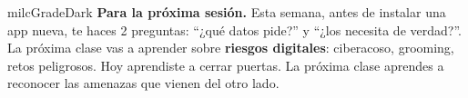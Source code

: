 \documentclass[11pt,letterpaper]{article}
\begin{document}
\begin{infoband}{milcGradeDark}
\textbf{Para la próxima sesión.} Esta semana, antes de instalar una app nueva, te haces 2 preguntas: ``¿qué datos pide?'' y ``¿los necesita de verdad?''. La próxima clase vas a aprender sobre \textbf{riesgos digitales}: ciberacoso, grooming, retos peligrosos. Hoy aprendiste a cerrar puertas. La próxima clase aprendes a reconocer las amenazas que vienen del otro lado.
\end{infoband}
\end{document}
